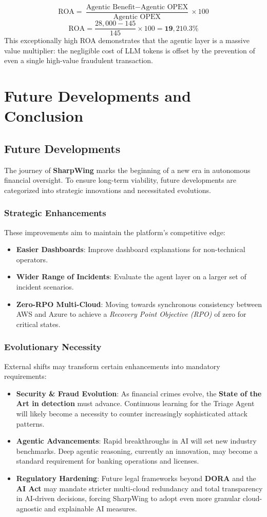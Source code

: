 \documentclass[12pt]{report}
\begin{document}
$$
\text{ROA} = \frac{\text{Agentic Benefit} - \text{Agentic OPEX}}{\text{Agentic OPEX}} \times 100
$$
$$
\text{ROA} = \frac{28,000 - 145}{145} \times 100 = \mathbf{19,210.3\%}
$$
This exceptionally high ROA demonstrates that the agentic layer is a massive value multiplier: the negligible cost of LLM tokens is offset by the prevention of even a single high-value fraudulent transaction.

\chapter{Future Developments and Conclusion}

\section{Future Developments}
The journey of \textbf{SharpWing} marks the beginning of a new era in autonomous financial oversight. To ensure long-term viability, future developments are categorized into strategic innovations and necessitated evolutions.

\subsection{Strategic Enhancements}
These improvements aim to maintain the platform's competitive edge:
\begin{itemize}
    \item \textbf{Easier Dashboards}: Improve dashboard explanations for non-technical operators.
    \item \textbf{Wider Range of Incidents}: Evaluate the agent layer on a larger set of incident scenarios.
    \item \textbf{Zero-RPO Multi-Cloud}: Moving towards synchronous consistency between AWS and Azure to achieve a \textit{Recovery Point Objective (RPO)} of zero for critical states.
\end{itemize}

\subsection{Evolutionary Necessity}
External shifts may transform certain enhancements into mandatory requirements:
\begin{itemize}
    \item \textbf{Security \& Fraud Evolution}: As financial crimes evolve, the \textbf{State of the Art in detection} must advance. Continuous learning for the Triage Agent will likely become a necessity to counter increasingly sophisticated attack patterns.
    \item \textbf{Agentic Advancements}: Rapid breakthroughs in AI will set new industry benchmarks. Deep agentic reasoning, currently an innovation, may become a standard requirement for banking operations and licenses.
    \item \textbf{Regulatory Hardening}: Future legal frameworks beyond \textbf{DORA} and the \textbf{AI Act} may mandate stricter multi-cloud redundancy and total transparency in AI-driven decisions, forcing SharpWing to adopt even more granular cloud-agnostic and explainable AI measures.
\end{itemize}
\end{document}

